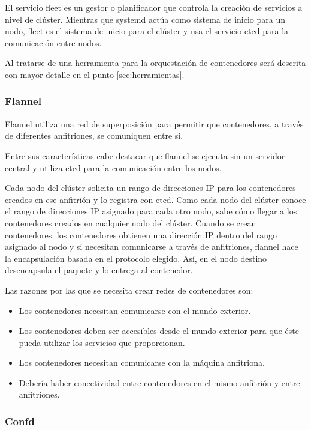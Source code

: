 El servicio fleet es un gestor o planificador que controla la creación de servicios a nivel de clúster. Mientras que systemd actúa como sistema de inicio para un nodo, fleet es el sistema de inicio para el clúster y usa el servicio etcd para la comunicación entre nodos.

Al tratarse de una herramienta para la orquestación de contenedores será descrita con mayor detalle en el punto \ref{sec:herramientas}.

\subsubsection{Flannel}

Flannel utiliza una red de superposición para permitir que contenedores, a través de diferentes anfitriones, se comuniquen entre sí.

Entre sus características cabe destacar que flannel se ejecuta sin un servidor central y utiliza etcd para la comunicación entre los nodos.

Cada nodo del clúster solicita un rango de direcciones IP para los contenedores creados en ese anfitrión y lo registra con etcd. Como cada nodo del clúster conoce el rango de direcciones IP asignado para cada otro nodo, sabe cómo llegar a los contenedores creados en cualquier nodo del clúster. Cuando se crean contenedores, los contenedores obtienen una dirección IP dentro del rango asignado al nodo y si necesitan comunicarse a través de anfitriones, flannel hace la encapsulación basada en el protocolo elegido. Así, en el nodo destino desencapsula el paquete y lo entrega al contenedor.

Las razones por las que se necesita crear redes de contenedores son:
\begin{itemize}
\item Los contenedores necesitan comunicarse con el mundo exterior.
\item Los contenedores deben ser accesibles desde el mundo exterior para que éste pueda utilizar los servicios que proporcionan.
\item Los contenedores necesitan comunicarse con la máquina anfitriona.
\item Debería haber conectividad entre contenedores en el mismo anfitrión y entre anfitriones.
\end{itemize}

\subsubsection{Confd}


